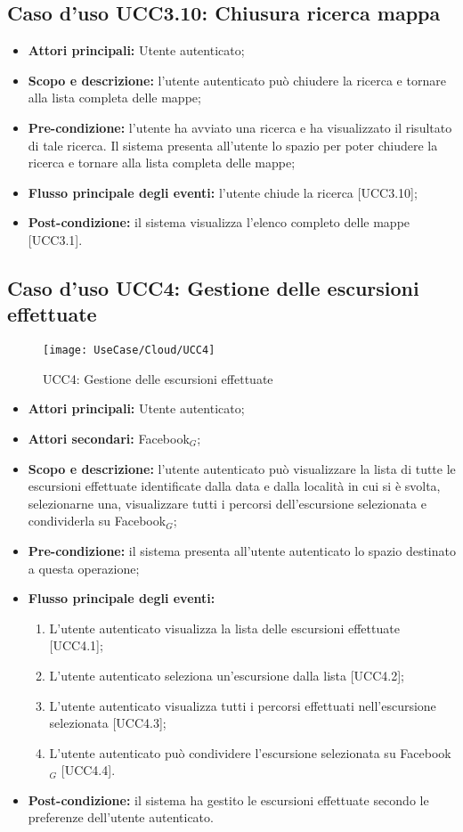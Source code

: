\subsection{Caso d'uso UCC3.10: Chiusura ricerca mappa}
\begin{itemize}
\item \textbf{Attori principali:} Utente autenticato;
\item \textbf{Scopo e descrizione:} l'utente autenticato può chiudere la ricerca e tornare alla lista completa delle mappe;
\item \textbf{Pre-condizione:} l'utente ha avviato una ricerca e ha visualizzato il risultato di tale ricerca. Il sistema presenta all'utente lo spazio per poter chiudere la ricerca e tornare alla lista completa delle mappe;
\item \textbf{Flusso principale degli eventi:} l'utente chiude la ricerca [UCC3.10];
\item \textbf{Post-condizione:} il sistema visualizza l'elenco completo delle mappe [UCC3.1]. 
\end{itemize}

\subsection{Caso d'uso UCC4: Gestione delle escursioni effettuate}

\begin{figure}[H]
\centering
\texttt{[image: UseCase/Cloud/UCC4]}
\caption{UCC4: Gestione delle escursioni effettuate}
\end{figure}

\begin{itemize}
\item \textbf{Attori principali:} Utente autenticato;
\item \textbf{Attori secondari:} Facebook$_{G}$;
\item \textbf{Scopo e descrizione:} l'utente autenticato può visualizzare la lista di tutte le escursioni effettuate identificate dalla data e dalla località in cui si è svolta, selezionarne una, visualizzare tutti i percorsi dell'escursione selezionata e condividerla su Facebook$_{G}$;
\item \textbf{Pre-condizione:} il sistema presenta all'utente autenticato lo spazio destinato a questa operazione;
\item \textbf{Flusso principale degli eventi:}
\begin{enumerate}
\item L'utente autenticato visualizza la lista delle escursioni effettuate [UCC4.1];
\item L'utente autenticato seleziona un'escursione dalla lista [UCC4.2];
\item L'utente autenticato visualizza tutti i percorsi effettuati nell'escursione selezionata [UCC4.3];
\item L'utente autenticato può condividere l'escursione selezionata su Facebook$_{G}$ [UCC4.4].
\end{enumerate}
\item \textbf{Post-condizione:} il sistema ha gestito le escursioni effettuate secondo le preferenze dell'utente autenticato.
\end{itemize}

